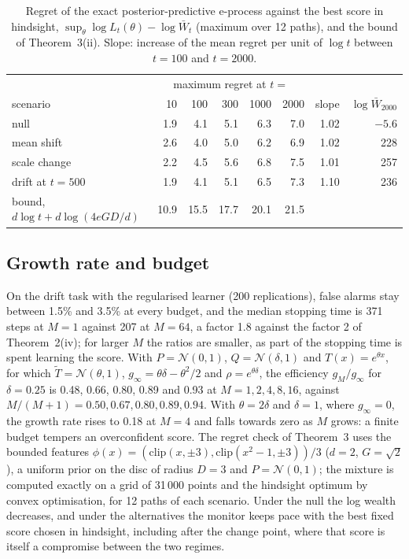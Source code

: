 \documentclass[11pt]{article}
\theoremstyle{remark}
\begin{document}
\begin{table}[t]
\centering
\caption{Regret of the exact posterior-predictive e-process against the best
score in hindsight, $\sup_\theta \log L_t(\theta) - \log \bar W_t$ (maximum
over 12 paths), and the bound of Theorem~3(ii). Slope: increase
of the mean regret per unit of $\log t$ between $t = 100$ and $t = 2000$.}
\label{tab:regret}
\begin{tabular}{lrrrrrrr}
\toprule
 & \multicolumn{5}{c}{maximum regret at $t =$} & & \\
scenario & 10 & 100 & 300 & 1000 & 2000 & slope & $\log \bar W_{2000}$ \\
\midrule
null & 1.9 & 4.1 & 5.1 & 6.3 & 7.0 & 1.02 & $-5.6$ \\
mean shift & 2.6 & 4.0 & 5.0 & 6.2 & 6.9 & 1.02 & 228 \\
scale change & 2.2 & 4.5 & 5.6 & 6.8 & 7.5 & 1.01 & 257 \\
drift at $t = 500$ & 1.9 & 4.1 & 5.1 & 6.5 & 7.3 & 1.10 & 236 \\
\midrule
bound, $d\log t + d\log(4eGD/d)$ & 10.9 & 15.5 & 17.7 & 20.1 & 21.5 & & \\
\bottomrule
\end{tabular}
\end{table}

\subsection{Growth rate and budget}

On the drift task with the regularised learner (200 replications), false
alarms stay between 1.5\% and 3.5\% at every budget, and the median stopping
time is 371 steps at $M = 1$ against 207 at $M = 64$, a factor 1.8 against the
factor 2 of Theorem~2(iv); for larger $M$ the ratios are smaller, as part of
the stopping time is spent learning the score. With $P = \mathcal N(0,1)$,
$Q = \mathcal N(\delta, 1)$ and $T(x) = e^{\theta x}$, for which
$\tilde T = \mathcal N(\theta, 1)$, $g_\infty = \theta\delta - \theta^2/2$ and
$\rho = e^{\theta\delta}$, the efficiency $g_M/g_\infty$ for $\delta = 0.25$ is
0.48, 0.66, 0.80, 0.89 and 0.93 at $M = 1, 2, 4, 8, 16$, against
$M/(M+1) = 0.50, 0.67, 0.80, 0.89, 0.94$. With $\theta = 2\delta$ and
$\delta = 1$, where $g_\infty = 0$, the growth rate rises to 0.18 at $M = 4$ and
falls towards zero as $M$ grows: a finite budget tempers an overconfident
score. The regret check of Theorem~3 uses the bounded features
$\phi(x) = (\mathrm{clip}(x, \pm 3), \mathrm{clip}(x^2 - 1, \pm 3))/3$ ($d = 2$,
$G = \sqrt 2$), a uniform prior on the disc of radius $D = 3$ and
$P = \mathcal N(0,1)$; the mixture is computed exactly on a grid of 31\,000
points and the hindsight optimum by convex optimisation, for 12 paths of each
scenario. Under the null the log wealth decreases, and under the alternatives
the monitor keeps pace with the best fixed score chosen in hindsight,
including after the change point, where that score is itself a compromise
between the two regimes.
\end{document}
